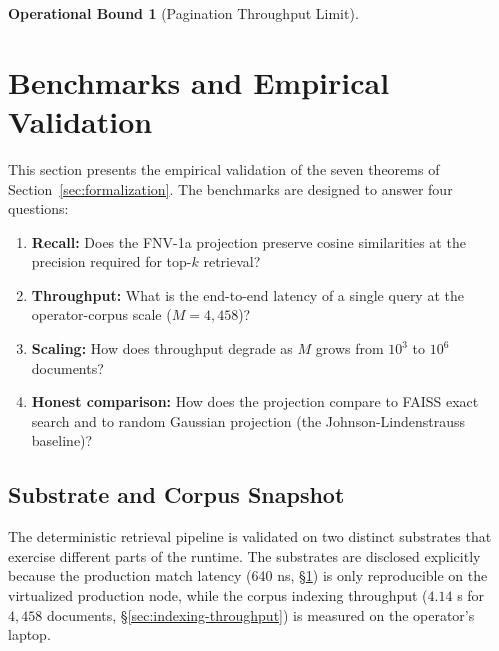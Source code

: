 \documentclass[10pt,twocolumn]{article}
\theoremstyle{definition}
\newtheorem{operationalbound}[theorem]{Operational Bound}
\theoremstyle{remark}
\begin{document}
\begin{operationalbound}[Pagination Throughput Limit]




\setcounter{section}{9}
\section{Benchmarks and Empirical Validation}
\label{sec:benchmarks}

This section presents the empirical validation of the seven theorems
of Section~\ref{sec:formalization}. The benchmarks are designed to
answer four questions:
\begin{enumerate}
\item \textbf{Recall:} Does the FNV-1a projection preserve cosine
      similarities at the precision required for top-$k$ retrieval?
\item \textbf{Throughput:} What is the end-to-end latency of a single
      query at the operator-corpus scale ($M = 4{,}458$)?
\item \textbf{Scaling:} How does throughput degrade as $M$ grows from
      $10^3$ to $10^6$ documents?
\item \textbf{Honest comparison:} How does the projection compare to
      FAISS exact search and to random Gaussian projection (the
      Johnson-Lindenstrauss baseline)?
\end{enumerate}

\subsection{Substrate and Corpus Snapshot}

The deterministic retrieval pipeline is validated on two distinct
substrates that exercise different parts of the runtime. The
substrates are disclosed explicitly because the production match
latency (640 ns, \S\ref{sec:benchmarks}) is only reproducible on the
virtualized production node, while the corpus indexing throughput
($4.14$ s for $4{,}458$ documents, \S\ref{sec:indexing-throughput}) is
measured on the operator's laptop.


\end{operationalbound}
\end{document}

